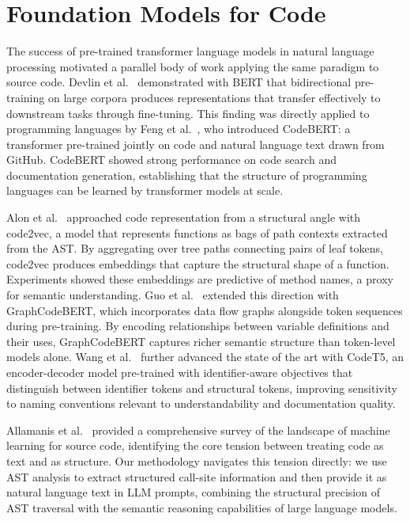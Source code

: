 \documentclass[12pt]{report}
\begin{document}
\section{Foundation Models for Code}

The success of pre-trained transformer language models in natural language processing motivated a parallel body of work applying the same paradigm to source code. Devlin et al.~\cite{devlin2019bert} demonstrated with BERT that bidirectional pre-training on large corpora produces representations that transfer effectively to downstream tasks through fine-tuning. This finding was directly applied to programming languages by Feng et al.~\cite{feng2020codebert}, who introduced CodeBERT: a transformer pre-trained jointly on code and natural language text drawn from GitHub. CodeBERT showed strong performance on code search and documentation generation, establishing that the structure of programming languages can be learned by transformer models at scale.

Alon et al.~\cite{alon2019code2vec} approached code representation from a structural angle with code2vec, a model that represents functions as bags of path contexts extracted from the AST. By aggregating over tree paths connecting pairs of leaf tokens, code2vec produces embeddings that capture the structural shape of a function. Experiments showed these embeddings are predictive of method names, a proxy for semantic understanding. Guo et al.~\cite{guo2021graphcodebert} extended this direction with GraphCodeBERT, which incorporates data flow graphs alongside token sequences during pre-training. By encoding relationships between variable definitions and their uses, GraphCodeBERT captures richer semantic structure than token-level models alone. Wang et al.~\cite{wang2021codet5} further advanced the state of the art with CodeT5, an encoder-decoder model pre-trained with identifier-aware objectives that distinguish between identifier tokens and structural tokens, improving sensitivity to naming conventions relevant to understandability and documentation quality.

Allamanis et al.~\cite{allamanis2018survey} provided a comprehensive survey of the landscape of machine learning for source code, identifying the core tension between treating code as text and as structure. Our methodology navigates this tension directly: we use AST analysis to extract structured call-site information and then provide it as natural language text in LLM prompts, combining the structural precision of AST traversal with the semantic reasoning capabilities of large language models.
\end{document}
